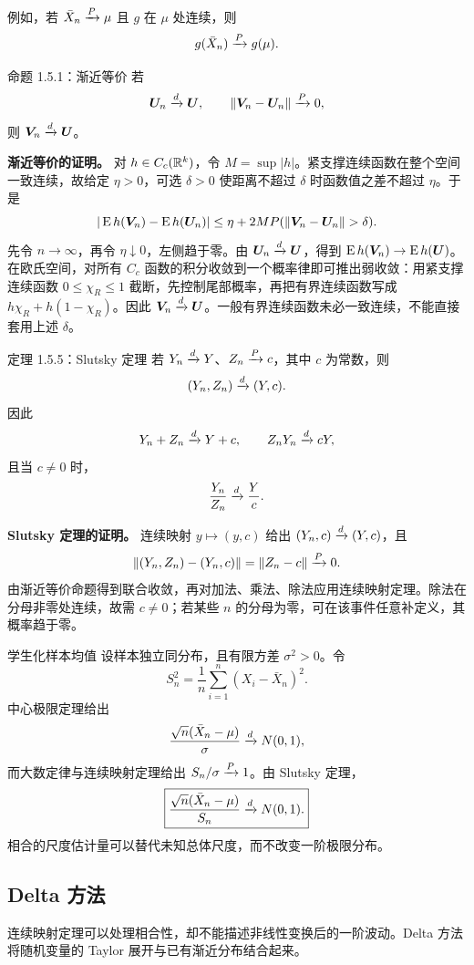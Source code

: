 例如，若 $\bar X_n\xrightarrow{P}\mu$ 且 $g$ 在 $\mu$ 处连续，则
\[
 g(\bar X_n)\xrightarrow{P} g(\mu).
\]

\begin{definitionbox}{命题 1.5.1：渐近等价}
若
\[
 \bm U_n\xrightarrow{d}\bm U,
 \qquad
 \|\bm V_n-\bm U_n\|\xrightarrow{P}0,
\]
则 $\bm V_n\xrightarrow{d}\bm U$。
\end{definitionbox}

\textbf{渐近等价的证明。} 对 $h\in C_c(\mathbb R^k)$，令 $M=\sup|h|$。紧支撑连续函数在整个空间一致连续，故给定 $\eta>0$，可选 $\delta>0$ 使距离不超过 $\delta$ 时函数值之差不超过 $\eta$。于是
\[
 |\E h(\bm V_n)-\E h(\bm U_n)|
 \le\eta+2M P(\|\bm V_n-\bm U_n\|>\delta).
\]
先令 $n\to\infty$，再令 $\eta\downarrow0$，左侧趋于零。由 $\bm U_n\xrightarrow{d}\bm U$，得到 $\operatorname{E} h(\bm V_n)\to\operatorname{E} h(\bm U)$。在欧氏空间，对所有 $C_c$ 函数的积分收敛到一个概率律即可推出弱收敛：用紧支撑连续函数 $0\le\chi_R\le1$ 截断，先控制尾部概率，再把有界连续函数写成 $h\chi_R+h(1-\chi_R)$。因此 $\bm V_n\xrightarrow{d}\bm U$。一般有界连续函数未必一致连续，不能直接套用上述 $\delta$。

\begin{definitionbox}{定理 1.5.5：Slutsky 定理}
若 $Y_n\xrightarrow{d} Y$、$Z_n\xrightarrow{P} c$，其中 $c$ 为常数，则
\[
 (Y_n,Z_n)\xrightarrow{d}(Y,c).
\]
因此
\[
 Y_n+Z_n\xrightarrow{d} Y+c,
 \qquad
 Z_nY_n\xrightarrow{d} cY,
\]
且当 $c\neq0$ 时，
\[
 \frac{Y_n}{Z_n}\xrightarrow{d}\frac{Y}{c}.
\]
\end{definitionbox}

\textbf{Slutsky 定理的证明。} 连续映射 $y\mapsto(y,c)$ 给出 $(Y_n,c)\xrightarrow{d}(Y,c)$，且
\[
 \|(Y_n,Z_n)-(Y_n,c)\|=\|Z_n-c\|\xrightarrow{P}0.
\]
由渐近等价命题得到联合收敛，再对加法、乘法、除法应用连续映射定理。除法在分母非零处连续，故需 $c\ne0$；若某些 $n$ 的分母为零，可在该事件任意补定义，其概率趋于零。

\begin{examplebox}{学生化样本均值}
设样本独立同分布，且有限方差 $\sigma^2>0$。令
\[
 S_n^2=\frac1n\sum_{i=1}^n(X_i-\bar X_n)^2.
\]
中心极限定理给出
\[
 \frac{\sqrt n(\bar X_n-\mu)}\sigma\xrightarrow{d} N(0,1),
\]
而大数定律与连续映射定理给出 $S_n/\sigma\xrightarrow{P}1$。由 Slutsky 定理，
\[
 \boxed{
 \frac{\sqrt n(\bar X_n-\mu)}{S_n}
 \xrightarrow{d} N(0,1).}
\]
相合的尺度估计量可以替代未知总体尺度，而不改变一阶极限分布。
\end{examplebox}

\subsection{Delta 方法}

连续映射定理可以处理相合性，却不能描述非线性变换后的一阶波动。Delta 方法将随机变量的 Taylor 展开与已有渐近分布结合起来。

